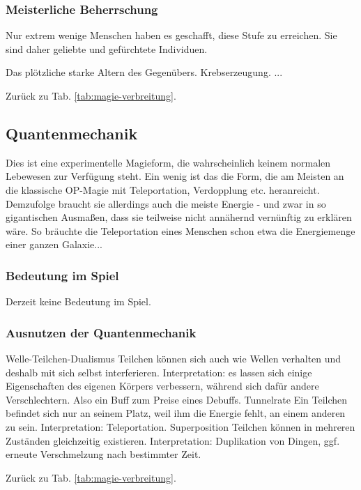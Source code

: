 \subsubsection{Meisterliche Beherrschung} 
Nur extrem wenige Menschen haben es geschafft, diese Stufe zu erreichen.
Sie sind daher geliebte und gefürchtete Individuen.
\begin{outline}
	\1 Das plötzliche starke Altern des Gegenübers.
	\1 Krebserzeugung.
	\1 ...
\end{outline}
Zurück zu Tab. \ref{tab:magie-verbreitung}.



\subsection{Quantenmechanik}\label{sec:quantenmechanikmagie}
Dies ist eine experimentelle Magieform, die wahrscheinlich keinem normalen Lebewesen zur Verfügung steht.
Ein wenig ist das die Form, die am Meisten an die klassische OP-Magie mit Teleportation, Verdopplung etc. heranreicht.
Demzufolge braucht sie allerdings auch die meiste Energie - und zwar in so gigantischen Ausmaßen, dass sie teilweise nicht annähernd vernünftig zu erklären wäre.
So bräuchte die Teleportation eines Menschen schon etwa die Energiemenge einer ganzen Galaxie...

\subsubsection{Bedeutung im Spiel}
Derzeit keine Bedeutung im Spiel.

\subsubsection{Ausnutzen der Quantenmechanik}
\begin{outline}
	\1 Welle-Teilchen-Dualismus
		\2 Teilchen können sich auch wie Wellen verhalten und deshalb mit sich selbst interferieren.
		\2 Interpretation: es lassen sich einige Eigenschaften des eigenen Körpers verbessern, während sich dafür andere Verschlechtern.
		Also ein Buff zum Preise eines Debuffs.
	\1 Tunnelrate
		\2 Ein Teilchen befindet sich nur an seinem Platz, weil ihm die Energie fehlt, an einem anderen zu sein.
		\2 Interpretation: Teleportation.
	\1 Superposition
		\2 Teilchen können in mehreren Zuständen gleichzeitig existieren.
		\2 Interpretation: Duplikation von Dingen, ggf. erneute Verschmelzung nach bestimmter Zeit.
\end{outline}
Zurück zu Tab. \ref{tab:magie-verbreitung}.



